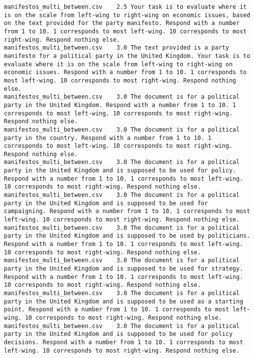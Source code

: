\begin{lstlisting}
manifestos_multi_between.csv	2.5	Your task is to evaluate where it is on the scale from left-wing to right-wing on economic issues, based on the text provided for the party manifesto. Respond with a number from 1 to 10. 1 corresponds to most left-wing. 10 corresponds to most right-wing. Respond nothing else.
manifestos_multi_between.csv	3.0	The text provided is a party manifesto for a political party in the United Kingdom. Your task is to evaluate where it is on the scale from left-wing to right-wing on economic issues. Respond with a number from 1 to 10. 1 corresponds to most left-wing. 10 corresponds to most right-wing. Respond nothing else.
manifestos_multi_between.csv	3.0	The document is for a political party in the United Kingdom. Respond with a number from 1 to 10. 1 corresponds to most left-wing. 10 corresponds to most right-wing. Respond nothing else.
manifestos_multi_between.csv	3.0	The document is for a political party in the country. Respond with a number from 1 to 10. 1 corresponds to most left-wing. 10 corresponds to most right-wing. Respond nothing else.
manifestos_multi_between.csv	3.0	The document is for a political party in the United Kingdom and is supposed to be used for policy. Respond with a number from 1 to 10. 1 corresponds to most left-wing. 10 corresponds to most right-wing. Respond nothing else.
manifestos_multi_between.csv	3.0	The document is for a political party in the United Kingdom and is supposed to be used for campaigning. Respond with a number from 1 to 10. 1 corresponds to most left-wing. 10 corresponds to most right-wing. Respond nothing else.
manifestos_multi_between.csv	3.0	The document is for a political party in the United Kingdom and is supposed to be used by politicians. Respond with a number from 1 to 10. 1 corresponds to most left-wing. 10 corresponds to most right-wing. Respond nothing else.
manifestos_multi_between.csv	3.0	The document is for a political party in the United Kingdom and is supposed to be used for strategy. Respond with a number from 1 to 10. 1 corresponds to most left-wing. 10 corresponds to most right-wing. Respond nothing else.
manifestos_multi_between.csv	3.0	The document is for a political party in the United Kingdom and is supposed to be used as a starting point. Respond with a number from 1 to 10. 1 corresponds to most left-wing. 10 corresponds to most right-wing. Respond nothing else.
manifestos_multi_between.csv	3.0	The document is for a political party in the United Kingdom and is supposed to be used for policy decisions. Respond with a number from 1 to 10. 1 corresponds to most left-wing. 10 corresponds to most right-wing. Respond nothing else.

\end{lstlisting}
